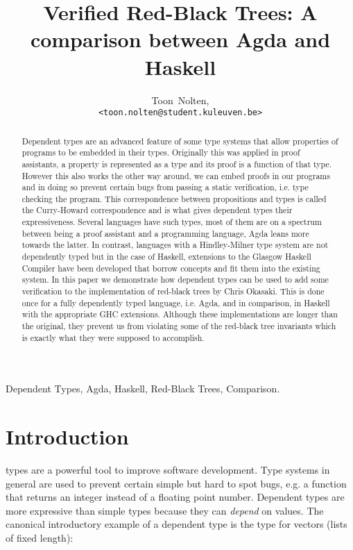 \documentclass[journal, retainorgcmds]{IEEEtran}
\begin{document}
\title{Verified Red-Black Trees: A comparison between Agda and Haskell}
\author{Toon~Nolten,\\ \texttt{<toon.nolten@student.kuleuven.be>}}%
\maketitle


\begin{abstract}
  Dependent types are an advanced feature of some type systems that allow
  properties of programs to be embedded in their types.
  Originally this was applied in proof assistants, a property is represented
  as a type and its proof is a function of that type.
  However this also works the other way around, we can embed proofs in our
  programs and in doing so prevent certain bugs from passing a static
  verification, i.e. type checking the program.
  This correspondence between propositions and types is called the
  Curry-Howard correspondence and is what gives dependent types their
  expressiveness.
  Several languages have such types, most of them are on a spectrum between
  being a proof assistant and a programming language, Agda leans more towards
  the latter.
  In contrast, languages with a Hindley-Milner type system are not dependently
  typed but in the case of Haskell, extensions to the Glasgow Haskell Compiler
  have been developed that borrow concepts and fit them into the existing
  system.
  In this paper we demonstrate how dependent types can be used to add some
  verification to the implementation of red-black trees by Chris Okasaki.
  This is done once for a fully dependently typed language, i.e. Agda, and in
  comparison, in Haskell with the appropriate GHC extensions.
  Although these implementations are longer than the original, they prevent us
  from violating some of the red-black tree invariants which is exactly what
  they were supposed to accomplish.
\end{abstract}

\begin{IEEEkeywords}
  Dependent Types, Agda, Haskell, Red-Black Trees, Comparison.
\end{IEEEkeywords}


\section{Introduction}
 types are a powerful tool to improve software
development.
Type systems in general are used to prevent certain simple but hard to spot
bugs, e.g. a function that returns an integer instead of a floating point
number.
Dependent types are more expressive than simple types because they can
\emph{depend} on values.
The canonical introductory example of a dependent type is the type for vectors
(lists of fixed length):
\end{document}
